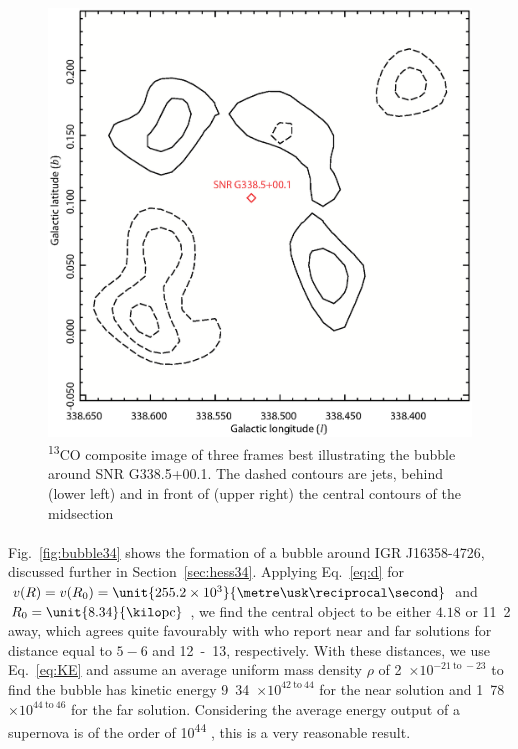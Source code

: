 \documentclass[a4paper, titlepage, oneside]{article}
\newcommand{\elem}[2]{\textsuperscript{#1}{#2}}
\newcommand{\e}[1]{\ensuremath{\times 10^{#1}}}
\newcommand{\parsec}{\mathrm{pc}}
\begin{document}
\begin{multicols}{2}
\begin{figure}[H]
  \centering
  \includegraphics[width = \columnwidth]{figures/bubble40}
  \caption{\elem{13}{C}O composite image of three frames best illustrating the bubble around SNR G338.5+00.1. The dashed contours are jets, behind (lower left) and in front of (upper right) the central contours of the midsection}
  \label{fig:bubble40}
\end{figure}

\paragraph{}
Fig.~\ref{fig:bubble34} shows the formation of a bubble around IGR J16358-4726, discussed further in Section~\ref{sec:hess34}. Applying Eq.~\ref{eq:d} for \(v(R) = v(R_0) = \unit{255.2\e{3}}{\metre\usk\reciprocal\second}\) and \(R_0 = \unit{8.34}{\kilo\parsec}\) \parencite{Reid:2014}, we find the central object to be either \(4.18\) or \unit{11.2}{\kilo\parsec} away, which agrees quite favourably with \textcite{Lutovinov:2005} who report near and far solutions for distance equal to \(5 - 6\) and \unit{12 - 13}{\kilo\parsec}, respectively. With these distances, we use Eq.~\ref{eq:KE} and assume an average uniform mass density \(\rho\) of \unit{2\e{-21 \mathrm{~to~} -23}}{\kilo\gram\usk\centi\metre\rpcubed} \parencite{Ferriere:2001} to find the bubble has kinetic energy \unit{9.34\e{42 \mathrm{~to~} 44}}{\joule} for the near solution and \unit{1.78\e{44 \mathrm{~to~} 46}}{\joule} for the far solution. Considering the average energy output of a supernova is of the order of \unit{10^{44}}{\joule} \parencite{Khokhlov:1993}, this is a very reasonable result.


\end{multicols}
\end{document}
